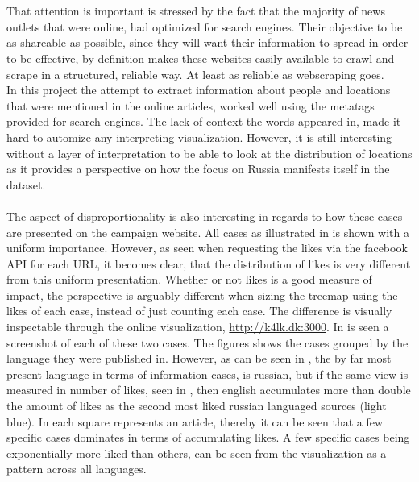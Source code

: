 \documentclass{article}
\begin{document}
\\\\
That attention is important is stressed by the fact that the majority of news outlets that were online, had optimized for search engines. Their objective to be as shareable as possible, since they will want their information to spread in order to be effective, by definition makes these websites easily available to crawl and scrape in a structured, reliable way. At least as reliable as webscraping goes. 
\\ 
In this project the attempt to extract information about people and locations that were mentioned in the online articles, worked well using the metatags provided for search engines. The lack of context the words appeared in, made it hard to automize any interpreting visualization. However, it is still interesting without a layer of interpretation to be able to look at the distribution of locations as it provides a perspective on how the focus on Russia manifests itself in the dataset.
\\\\
The aspect of disproportionality is also interesting in regards to how these cases are presented on the campaign website. All cases as illustrated in  is shown with a uniform importance. However, as seen when requesting the likes via the facebook API for each URL, it becomes clear, that the distribution of likes is very different from this uniform presentation. Whether or not likes is a good measure of impact, the perspective is arguably different when sizing the treemap using the likes of each case, instead of just counting each case. The difference is visually inspectable through the online visualization, \url{http://k4lk.dk:3000}. In  is seen a screenshot of each of these two cases. The figures shows the cases grouped by the language they were published in. However, as can be seen in , the by far most present language in terms of information cases, is russian, but if the same view is measured in number of likes, seen in , then english accumulates more than double the amount of likes as the second most liked russian languaged sources (light blue). In  each square represents an article, thereby it can be seen that a few specific cases dominates in terms of accumulating likes. A few specific cases being exponentially more liked than others, can be seen from the visualization as a pattern across all languages.
\end{document}
